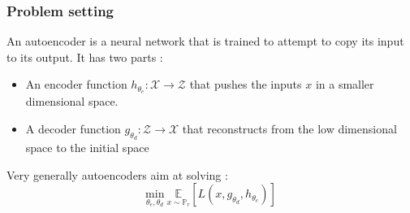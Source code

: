 \documentclass[french,9pt]{beamer}
\begin{document}
\begin{frame}
\frametitle{Problem setting}

An autoencoder is a neural network that is trained to attempt to copy its input to its output. It has two parts :

\begin{itemize}
\item An encoder function $h_{\theta_{e}} : \mathcal{X} \rightarrow \mathcal{Z}$ that pushes the inputs $x$ in a smaller dimensional space.
\item A decoder function $g_{\theta_{d}} : \mathcal{Z} \rightarrow \mathcal{X}$ that reconstructs from the low dimensional space to the initial space
\end{itemize}

Very generally autoencoders aim at solving  : 
\begin{equation}
\label{autoencodergeneral}
\underset{\theta_{e},\theta_{d}}{\text{min}} \ \underset{x \sim \mathbb{P}_{r}}{\mathbb{E}}[L(x,g_{\theta_{d}},h_{\theta_{e}})]
\end{equation}

\end{frame}

\end{document}
